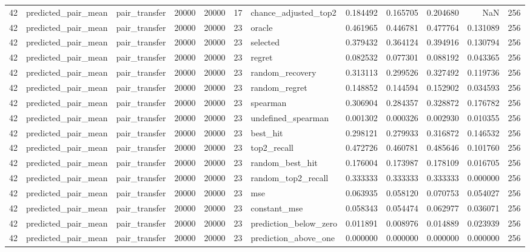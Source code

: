 \begin{tabular}{rllrrrlrrrrr}
42 & predicted_pair_mean & pair_transfer & 20000 & 20000 & 17 & chance_adjusted_top2 & 0.184492 & 0.165705 & 0.204680 & NaN & 256 \\
42 & predicted_pair_mean & pair_transfer & 20000 & 20000 & 23 & oracle & 0.461965 & 0.446781 & 0.477764 & 0.131089 & 256 \\
42 & predicted_pair_mean & pair_transfer & 20000 & 20000 & 23 & selected & 0.379432 & 0.364124 & 0.394916 & 0.130794 & 256 \\
42 & predicted_pair_mean & pair_transfer & 20000 & 20000 & 23 & regret & 0.082532 & 0.077301 & 0.088192 & 0.043365 & 256 \\
42 & predicted_pair_mean & pair_transfer & 20000 & 20000 & 23 & random_recovery & 0.313113 & 0.299526 & 0.327492 & 0.119736 & 256 \\
42 & predicted_pair_mean & pair_transfer & 20000 & 20000 & 23 & random_regret & 0.148852 & 0.144594 & 0.152902 & 0.034593 & 256 \\
42 & predicted_pair_mean & pair_transfer & 20000 & 20000 & 23 & spearman & 0.306904 & 0.284357 & 0.328872 & 0.176782 & 256 \\
42 & predicted_pair_mean & pair_transfer & 20000 & 20000 & 23 & undefined_spearman & 0.001302 & 0.000326 & 0.002930 & 0.010355 & 256 \\
42 & predicted_pair_mean & pair_transfer & 20000 & 20000 & 23 & best_hit & 0.298121 & 0.279933 & 0.316872 & 0.146532 & 256 \\
42 & predicted_pair_mean & pair_transfer & 20000 & 20000 & 23 & top2_recall & 0.472726 & 0.460781 & 0.485646 & 0.101760 & 256 \\
42 & predicted_pair_mean & pair_transfer & 20000 & 20000 & 23 & random_best_hit & 0.176004 & 0.173987 & 0.178109 & 0.016705 & 256 \\
42 & predicted_pair_mean & pair_transfer & 20000 & 20000 & 23 & random_top2_recall & 0.333333 & 0.333333 & 0.333333 & 0.000000 & 256 \\
42 & predicted_pair_mean & pair_transfer & 20000 & 20000 & 23 & mse & 0.063935 & 0.058120 & 0.070753 & 0.054027 & 256 \\
42 & predicted_pair_mean & pair_transfer & 20000 & 20000 & 23 & constant_mse & 0.058343 & 0.054474 & 0.062977 & 0.036071 & 256 \\
42 & predicted_pair_mean & pair_transfer & 20000 & 20000 & 23 & prediction_below_zero & 0.011891 & 0.008976 & 0.014889 & 0.023939 & 256 \\
42 & predicted_pair_mean & pair_transfer & 20000 & 20000 & 23 & prediction_above_one & 0.000000 & 0.000000 & 0.000000 & 0.000000 & 256 \\

\end{tabular}
